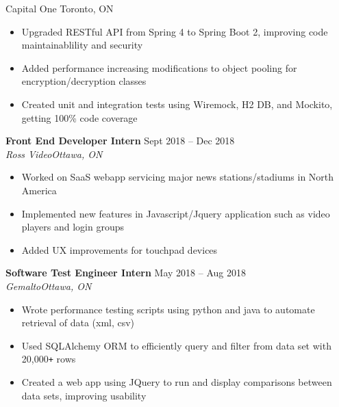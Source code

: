 \documentclass[letterpaper]{article}
\newcommand{\DatedEntry}[5]{\textbf{#1}
	\hfill \small#2\\
	\textit{#3}\hfill\textit{#4}\\\vspace{0.1cm}
	#5\vspace{0.1cm}
}
\begin{document}
{Capital One}
{Toronto, ON}
{\begin{itemize}[nolistsep]
	\item Upgraded RESTful API from Spring 4 to Spring Boot 2, improving code maintainablility and security
	\item Added performance increasing modifications to object pooling for encryption/decryption classes
	\item Created unit and integration tests using Wiremock, H2 DB, and Mockito, getting 100\% code coverage
\end{itemize}}
\DatedEntry{Front End Developer Intern}
{Sept 2018 -- Dec 2018}
{Ross Video}
{Ottawa, ON}
{\begin{itemize}[nolistsep]
	\item Worked on SaaS webapp servicing major news stations/stadiums in North America
	\item Implemented new features in Javascript/Jquery application such as video players and login groups
	\item Added UX improvements for touchpad devices
\end{itemize}}
\DatedEntry{Software Test Engineer Intern}
{May 2018 -- Aug 2018}
{Gemalto}
{Ottawa, ON}
{\begin{itemize}[nolistsep]
	\item Wrote performance testing scripts using python and java to automate retrieval of data (xml, csv)
	\item Used SQLAlchemy ORM to efficiently query and filter from data set with 20,000\texttt{+} rows
	\item Created a web app using JQuery to run and display comparisons between data sets, improving usability
\end{itemize}}\vspace{-0.3cm}
\end{document}
